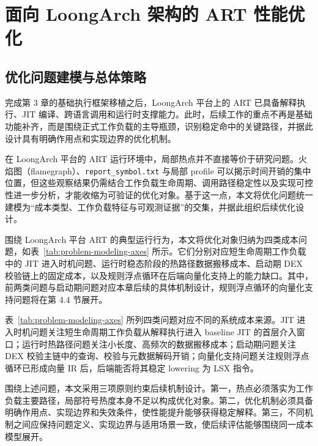 \chapter{面向 LoongArch 架构的 ART 性能优化}\label{chap:optimization}

\section{优化问题建模与总体策略}

完成第 3 章的基础执行框架移植之后，LoongArch 平台上的 ART 已具备解释执行、JIT 编译、跨语言调用和运行时支撑能力。此时，后续工作的重点不再是基础功能补齐，而是围绕正式工作负载的主导瓶颈，识别稳定命中的关键路径，并据此设计具有明确作用点和实现边界的优化机制。

在 LoongArch 平台的 ART 运行环境中，局部热点并不直接等价于研究问题。火焰图（flamegraph）、\texttt{report\_symbol.txt} 与局部 profile 可以揭示时间开销的集中位置，但这些观察结果仍需结合工作负载生命周期、调用路径稳定性以及实现可控性进一步分析，才能收缩为可验证的优化对象。基于这一点，本文将优化问题统一建模为“成本类型、工作负载特征与可观测证据”的交集，并据此组织后续优化设计。

围绕 LoongArch 平台 ART 的典型运行行为，本文将优化对象归纳为四类成本问题，如表~\ref{tab:problem-modeling-axes} 所示。它们分别对应短生命周期工作负载中的 JIT 进入时机问题、运行时稳态阶段的热路径数据搬移成本、启动期 DEX 校验链上的固定成本，以及规则浮点循环在后端向量化支持上的能力缺口。其中，前两类问题与启动期问题对应本章后续的具体机制设计，规则浮点循环的向量化支持问题将在第 4.4 节展开。

表~\ref{tab:problem-modeling-axes} 所列四类问题对应不同的系统成本来源。JIT 进入时机问题关注短生命周期工作负载从解释执行进入 baseline JIT 的首层介入窗口；运行时热路径问题关注小长度、高频次的数据搬移成本；启动期问题关注 DEX 校验主链中的查询、校验与元数据解码开销；向量化支持问题关注规则浮点循环已形成向量 IR 后，后端能否将其稳定 lowering 为 LSX 指令。

围绕上述问题，本文采用三项原则约束后续机制设计。第一，热点必须落实为工作负载主要路径，局部符号热度本身不足以构成优化对象。第二，优化机制必须具备明确作用点、实现边界和失效条件，使性能提升能够获得稳定解释。第三，不同机制之间应保持问题定义、实现边界与适用场景一致，使后续评估能够围绕同一成本模型展开。

